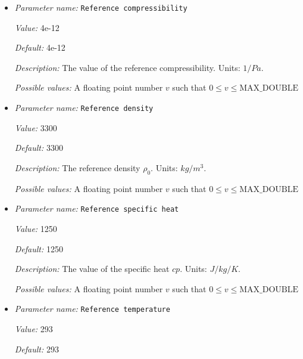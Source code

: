 \begin{itemize}
{\it Possible values:} A list of 0 to 4294967295 elements where each element is [A floating point number $v$ such that $0 \leq v \leq \text{MAX\_DOUBLE}$]
\item {\it Parameter name:} {\tt Reference compressibility}
\label{parameters:Material model/Grain size model/Reference compressibility}


{\it Value:} 4e-12


{\it Default:} 4e-12


{\it Description:} The value of the reference compressibility. Units: $1/Pa$.


{\it Possible values:} A floating point number $v$ such that $0 \leq v \leq \text{MAX\_DOUBLE}$
\item {\it Parameter name:} {\tt Reference density}
\label{parameters:Material model/Grain size model/Reference density}


{\it Value:} 3300


{\it Default:} 3300


{\it Description:} The reference density $\rho_0$. Units: $kg/m^3$.


{\it Possible values:} A floating point number $v$ such that $0 \leq v \leq \text{MAX\_DOUBLE}$
\item {\it Parameter name:} {\tt Reference specific heat}
\label{parameters:Material model/Grain size model/Reference specific heat}


{\it Value:} 1250


{\it Default:} 1250


{\it Description:} The value of the specific heat $cp$. Units: $J/kg/K$.


{\it Possible values:} A floating point number $v$ such that $0 \leq v \leq \text{MAX\_DOUBLE}$
\item {\it Parameter name:} {\tt Reference temperature}
\label{parameters:Material model/Grain size model/Reference temperature}


{\it Value:} 293


{\it Default:} 293



\end{itemize}
